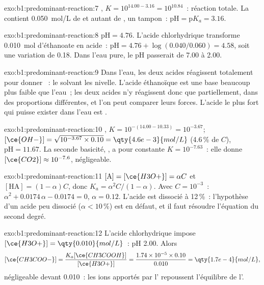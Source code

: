 \begin{solution}{exo:b1:predominant-reaction:7}
, $K = 10^{14.00 - 3.16} = 10^{10.84}$~:
réaction totale. La  contient \qty{0.050}{mol/L} de
 et autant de , un tampon~: $\mathrm{pH} = \mathrm{p}K_a = 3.16$.
\end{solution}

\begin{solution}{exo:b1:predominant-reaction:8}
$\mathrm{pH} = 4.76$. L'acide chlorhydrique transforme \qty{0.010}{mol}
d'éthanoate en acide~: $\mathrm{pH} = 4.76 + \log(0.040/0.060) = 4.58$,
soit une variation de 0.18. Dans l'eau pure, le pH passerait de 7.00 à
2.00.
\end{solution}

\begin{solution}{exo:b1:predominant-reaction:9}
Dans l'eau, les deux acides réagissent totalement pour donner
~: le solvant les nivelle. L'acide éthanoïque est une base
beaucoup plus faible que l'eau~; les deux acides n'y réagissent donc
que partiellement, dans des proportions différentes, et l'on peut
comparer leurs forces. L'acide le plus fort qui puisse exister dans
l'eau est .
\end{solution}

\begin{solution}{exo:b1:predominant-reaction:10}
, $K = 10^{-(14.00 - 10.33)} = 10^{-3.67}$;
$[\ce{OH-}] = \sqrt{10^{-3.67} \times 0.10} = \qty{4.6e-3}{mol/L}$
(4.6\,\% de $C$), $\mathrm{pH} = 11.67$. La seconde basicité,
, a pour constante $K = 10^{-7.63}$~: elle donne
$[\ce{CO2}] \approx
10^{-7.6}$, négligeable.
\end{solution}

\begin{solution}{exo:b1:predominant-reaction:11}
$[\mathrm{A}] = [\ce{H3O+}] = \alpha C$ et $[\mathrm{HA}] = (1 - \alpha)C$,
donc $K_a = \alpha^2C/(1 - \alpha)$. Avec $C = 10^{-3}$~: $\alpha^2 +
0.0174\,\alpha - 0.0174 = 0$, $\alpha = 0.12$. L'acide est dissocié à
12\,\%~: l'hypothèse d'un acide peu dissocié ($\alpha <
10\,\%$) est en défaut, et il faut résoudre l'équation du second degré.
\end{solution}

\begin{solution}{exo:b1:predominant-reaction:12}
L'acide chlorhydrique impose $[\ce{H3O+}] = \qty{0.010}{mol/L}$~: pH 2.00. Alors
\[
  [\ce{CH3COO-}] = \frac{K_a[\ce{CH3COOH}]}{[\ce{H3O+}]} = \frac{1.74 \times 10^{-5}
  \times 0.10}{0.010} = \qty{1.7e-4}{mol/L},
\]
négligeable devant 0.010~: les ions
 apportés par l' repoussent l'équilibre de l'.
\end{solution}

